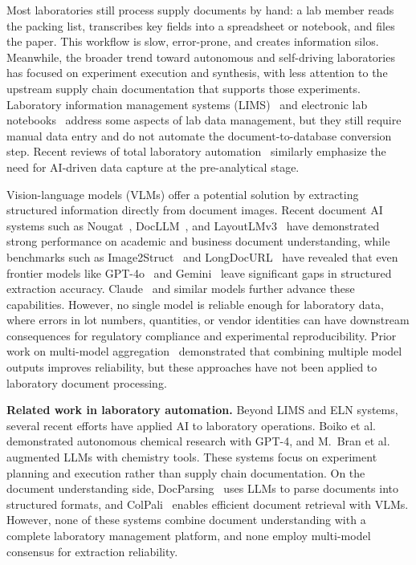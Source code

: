 \documentclass[11pt]{article}
\begin{document}
Most laboratories still process supply documents by hand: a lab member reads
the packing list, transcribes key fields into a spreadsheet or notebook, and
files the paper. This workflow is slow, error-prone, and creates information
silos. Meanwhile, the broader trend toward autonomous and self-driving
laboratories~\citep{abolhasani2023rise, macleod2020self,
szymanski2023autonomous, adam2024automated, canty2025science} has
focused on experiment execution and synthesis, with less attention to the
upstream supply chain documentation that supports those experiments.
Laboratory information management systems
(LIMS)~\citep{trigg2008current} and electronic lab
notebooks~\citep{avery2000electronic, barillari2016openBIS,
schmid2016scinote} address some aspects of lab data management, but they
still require manual data entry and do not automate the
document-to-database conversion step. Recent reviews of total laboratory
automation~\citep{nam2025revolutionizing} similarly emphasize the need
for AI-driven data capture at the pre-analytical stage.

Vision-language models (VLMs) offer a potential solution by extracting
structured information directly from document images. Recent document AI
systems such as Nougat~\citep{blecher2023nougat},
DocLLM~\citep{wang2024docllm}, and
LayoutLMv3~\citep{huang2022layoutlmv3} have demonstrated strong
performance on academic and business document understanding, while
benchmarks such as
Image2Struct~\citep{roberts2024image2struct} and
LongDocURL~\citep{deng2025longdocurl} have revealed that even
frontier models like GPT-4o~\citep{achiam2023gpt4} and
Gemini~\citep{team2024gemini} leave significant gaps in structured
extraction accuracy. Claude~\citep{anthropic2024claude} and similar
models further advance these capabilities. However, no single model is
reliable enough for laboratory data, where errors in lot numbers,
quantities, or vendor identities can have downstream consequences for
regulatory compliance and experimental reproducibility. Prior work on
multi-model aggregation~\citep{wang2023self, jiang2023llm,
wang2024mixture} demonstrated that combining multiple model outputs
improves reliability, but these approaches have not been applied to
laboratory document processing.

\textbf{Related work in laboratory automation.} Beyond LIMS and ELN
systems, several recent efforts have applied AI to laboratory operations.
Boiko et al.~\citep{boiko2023autonomous} demonstrated autonomous chemical
research with GPT-4, and M.~Bran et al.~\citep{m2024augmenting} augmented
LLMs with chemistry tools. These systems focus on experiment planning and
execution rather than supply chain documentation. On the document
understanding side, DocParsing~\citep{boiko2023parsing} uses LLMs to parse
documents into structured formats, and ColPali~\citep{faysse2024colpali}
enables efficient document retrieval with VLMs. However, none of these
systems combine document understanding with a complete laboratory
management platform, and none employ multi-model consensus for extraction
reliability.
\end{document}
